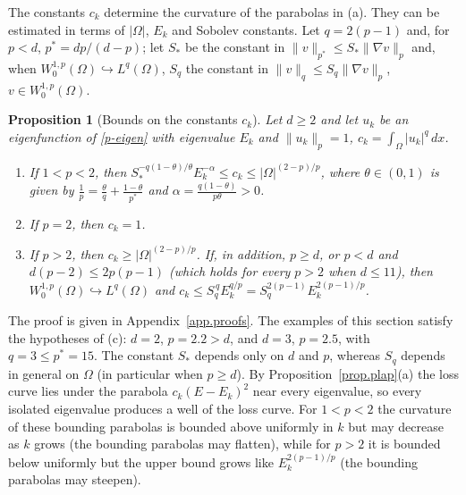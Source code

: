 \documentclass[10pt]{amsart}
\newenvironment{revblock}{\color{blue}}{}
\theoremstyle{definition}
\theoremstyle{remark}
\theoremstyle{plain}
\newtheorem{proposition}[theorem]{Proposition}
\begin{document}
\begin{revblock}
The constants $c_k$ determine the curvature of the parabolas in (a). They can be estimated in terms of
$|\Omega|$, $E_k$ and Sobolev constants. Let $q=2(p-1)$ and, for $p<d$, $p^*=dp/(d-p)$; let $S_*$ be the
constant in $\|v\|_{p^*}\le S_*\|\nabla v\|_p$ and, when $W^{1,p}_0(\Omega)\hookrightarrow L^q(\Omega)$,
$S_q$ the constant in $\|v\|_q\le S_q\|\nabla v\|_p$, $v\in W^{1,p}_0(\Omega)$.

\begin{proposition}[Bounds on the constants $c_k$]\label{prop.ck}
Let $d\ge2$ and let $u_k$ be an eigenfunction of \eqref{p-eigen} with eigenvalue $E_k$ and
$\|u_k\|_p=1$, $c_k=\int_\Omega|u_k|^q\,dx$.
\begin{enumerate}
\item[(a)] If $1<p<2$, then $S_*^{-q(1-\theta)/\theta}E_k^{-\alpha}\le c_k\le|\Omega|^{(2-p)/p}$, where
$\theta\in(0,1)$ is given by $\frac1p=\frac\theta q+\frac{1-\theta}{p^*}$ and $\alpha=\frac{q(1-\theta)}{p\theta}>0$.
\item[(b)] If $p=2$, then $c_k=1$.
\item[(c)] If $p>2$, then $c_k\ge|\Omega|^{(2-p)/p}$. If, in addition, $p\ge d$, or $p<d$ and
$d(p-2)\le2p(p-1)$ (which holds for every $p>2$ when $d\le11$), then
$W^{1,p}_0(\Omega)\hookrightarrow L^q(\Omega)$ and $c_k\le S_q^{\,q}E_k^{q/p}=S_q^{2(p-1)}E_k^{2(p-1)/p}$.
\end{enumerate}
\end{proposition}
The proof is given in Appendix~\ref{app.proofs}. The examples of this section satisfy the hypotheses
of (c): $d=2$, $p=2.2>d$, and $d=3$, $p=2.5$, with $q=3\le p^*=15$. The constant $S_*$ depends only on $d$ and $p$, whereas $S_q$ depends in general on
$\Omega$ (in particular when $p\ge d$). By Proposition~\ref{prop.plap}(a) the loss curve lies under the parabola $c_k(E-E_k)^2$ near every eigenvalue, so
every isolated eigenvalue produces a well of the loss curve. For $1<p<2$ the curvature of these bounding
parabolas is bounded above uniformly in $k$ but may decrease as $k$ grows (the bounding parabolas may
flatten), while for $p>2$ it is bounded below uniformly but the upper bound grows like
$E_k^{2(p-1)/p}$ (the bounding parabolas may steepen).


\end{revblock}
\end{document}
